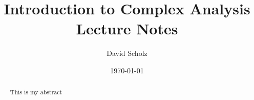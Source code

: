 \documentclass[a4paper,12pt,oneside]{article}
\title{Introduction to Complex Analysis\\[0.3cm] \Large Lecture Notes}
\date{\today}
\author{David Scholz}
\theoremstyle{plain}
\theoremstyle{definition}
\theoremstyle{definition}
\begin{document}
\begin{titlingpage}
\maketitle
\end{titlingpage}

\newpage

\setcounter{page}{1} %

\thispagestyle{empty}
  
\newpage  
\pagestyle{empty}

\newpage

\begin{abstract}
    This is my abstract
\end{abstract} 


\newpage
\pagestyle{empty}

\tableofcontents

\newpage
\pagestyle{fancy} 


\thispagestyle{empty}
\listoffigures

\newpage
\pagestyle{fancy}


\newpage


\thispagestyle{empty}
    
\end{document}
